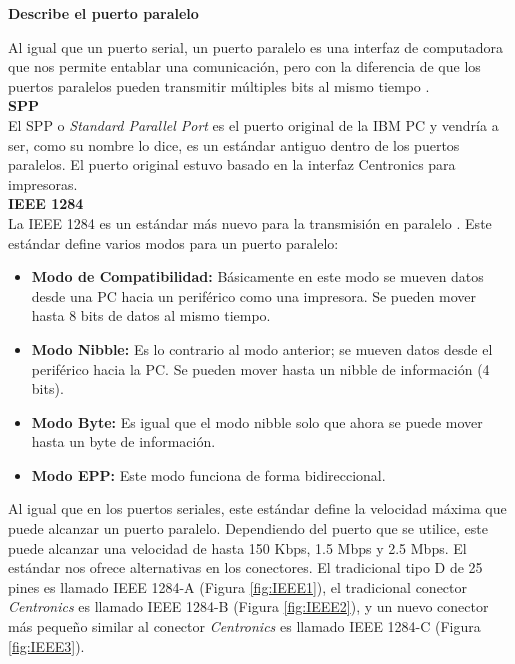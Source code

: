 \documentclass[a4paper,12pt]{article}
\begin{document}
\begin{enumerate}
  
 {\large \item  \textbf{Describe el puerto paralelo}} \par
 Al igual que un puerto serial, un puerto paralelo es una interfaz de computadora que nos
 permite entablar una comunicación, pero con la diferencia de que los puertos paralelos
 pueden transmitir múltiples bits al mismo tiempo \cite{parallelbook}. \\
 
 {\large \textbf{SPP}} \\
 El SPP o \textit{Standard Parallel Port} es el puerto original de la IBM PC y vendría
 a ser, como su nombre lo dice, es un estándar antiguo dentro de los puertos paralelos. El puerto
 original estuvo basado en la interfaz Centronics para impresoras. \\
 
 {\large \textbf{IEEE 1284}}\\ 
 La IEEE 1284 es un estándar más nuevo para la transmisión en paralelo \cite{IEEEparallel}.
 Este estándar define varios modos para un puerto paralelo:
 \begin{itemize}
  \item \textbf{Modo de Compatibilidad:} Básicamente en este modo se mueven datos desde una PC hacia
  un periférico como una impresora. Se pueden mover hasta 8 bits de datos al mismo tiempo.
  \item \textbf{Modo Nibble:} Es lo contrario al modo anterior; se mueven datos desde el periférico hacia la PC.
  Se pueden mover hasta un nibble de información (4 bits).
  \item \textbf{Modo Byte:} Es igual que el modo nibble solo que ahora se puede mover
  hasta un byte de información.
  \item \textbf{Modo EPP:} Este modo funciona de forma bidireccional.
 \end{itemize}

 Al igual que en los puertos seriales, este estándar define la velocidad máxima que puede alcanzar
 un puerto paralelo. Dependiendo del puerto que se utilice, este puede alcanzar una velocidad de hasta 
 150 Kbps, 1.5 Mbps y 2.5 Mbps. El estándar nos ofrece alternativas en los conectores.
 El tradicional tipo D de 25 pines es llamado IEEE 1284-A (Figura \ref{fig:IEEE1}), el tradicional conector
 \textit{Centronics} es llamado IEEE 1284-B (Figura \ref{fig:IEEE2}), y un nuevo conector más pequeño similar al conector \textit{Centronics}
 es llamado IEEE 1284-C (Figura \ref{fig:IEEE3}).
 

\end{enumerate}
\end{document}
